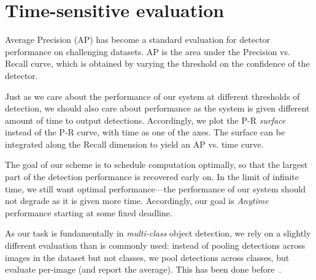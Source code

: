 \section{Time-sensitive evaluation} \label{sec:evaluation}
Average Precision (AP) has become a standard evaluation for detector performance on challenging datasets.
AP is the area under the Precision vs. Recall curve, which is obtained by varying the threshold on the confidence of the detector.

Just as we care about the performance of our system at different thresholds of detection, we should also care about performance as the system is given different amount of time to output detections.
Accordingly, we plot the P-R \emph{surface} instead of the P-R curve, with time as one of the axes.
The surface can be integrated along the Recall dimension to yield an AP vs. time curve.

The goal of our scheme is to schedule computation optimally, so that the largest part of the detection performance is recovered early on.
In the limit of infinite time, we still want optimal performance---the performance of our system should not degrade as it is given more time.
Accordingly, our goal is \emph{Anytime} performance starting at some fixed deadline.

As our task is fundamentally in \emph{multi-class} object detection, we rely on a slightly different evaluation than is commonly used: instead of pooling detections across images in the dataset but not classes, we pool detections across classes, but evaluate per-image (and report the average).
This has been done before~\cite{Desai2009}.